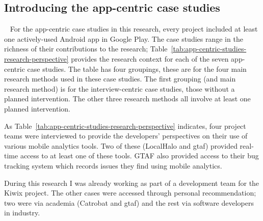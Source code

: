 \subsection{Introducing the app-centric case studies}~\label{methodology-introducing-the-app-centric-case-studies-section}
For the app-centric case studies in this research, every project included at least one actively-used Android app in Google Play. The case studies range in the richness of their contributions to the research; Table~\ref{tab:app-centric-studies-research-perspective} provides the research context for each of the seven app-centric case studies. The table has four groupings, these are for the four main research methods used in these case studies. The first grouping (and main research method) is for the interview-centric case studies, those without a planned intervention. The other three research methods all involve at least one planned intervention.

As Table~\ref{tab:app-centric-studies-research-perspective} indicates, four project teams were interviewed to provide the developers' perspectives on their use of various mobile analytics tools. Two of these (LocalHalo and \acrshort{gtaf}) provided real-time access to at least one of these tools. GTAF also provided access to their bug tracking system which records issues they find using mobile analytics.

During this research I was already working as part of a development team for the Kiwix project. The other cases were accessed through personal recommendation; two were via academia (Catrobat and \acrlong{gtaf}) and the rest via software developers in industry.


